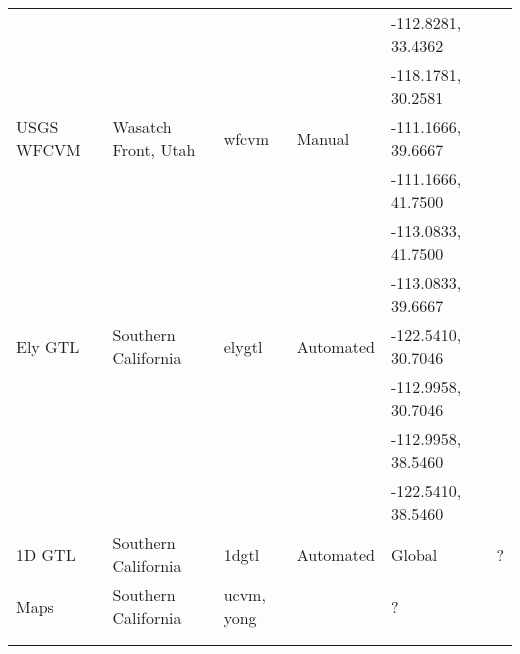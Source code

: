 \begin{table*}[ht!]
\begin{tabular}[]{lllllp{1.25in}}
                   &                       &               &              & -112.8281, 33.4362 &                              \\
                   &                       &               &              & -118.1781, 30.2581 &                              \\
USGS WFCVM         & Wasatch Front, Utah   & wfcvm         &  Manual      & -111.1666, 39.6667 & \citet{Magistrale_2006_Tech} \\
                   &                       &               &              & -111.1666, 41.7500 &                              \\
                   &                       &               &              & -113.0833, 41.7500 &                              \\
                   &                       &               &              & -113.0833, 39.6667 &                              \\
\hline
Ely GTL            & Southern California   & elygtl        &  Automated   & -122.5410, 30.7046 & \citet{Ely_2010_AGU}         \\
                   &                       &               &              & -112.9958, 30.7046 &                              \\
                   &                       &               &              & -112.9958, 38.5460 &                              \\
                   &                       &               &              & -122.5410, 38.5460 &                              \\
1D GTL             & Southern California   & 1dgtl         &  Automated   & Global             & ?                            \\
\hline
\vsthirty{} Maps   & Southern California   & ucvm, yong    &              & ?                  & \citet{Wills_2006_BSSA}      \\
                   &                       &               &              &                    & \citet{Wald_2007_BSSA}       \\
                   &                       &               &              &                    & \citet{Yong_2012_BSSA}       \\
\hline
\end{tabular}
\label{tab:cvms}
\end{table*}


